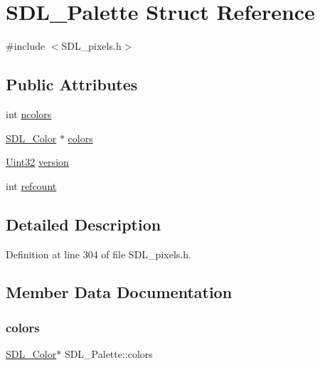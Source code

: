 \hypertarget{struct_s_d_l___palette}{}\section{S\+D\+L\+\_\+\+Palette Struct Reference}
\label{struct_s_d_l___palette}


{\ttfamily \#include $<$S\+D\+L\+\_\+pixels.\+h$>$}

\subsection*{Public Attributes}
\begin{DoxyCompactItemize}
\item 
int \mbox{\hyperlink{struct_s_d_l___palette_a81a0cc3197480e994c6b06f1f0567091}{ncolors}}
\item 
\mbox{\hyperlink{struct_s_d_l___color}{S\+D\+L\+\_\+\+Color}} $\ast$ \mbox{\hyperlink{struct_s_d_l___palette_ad757a50037f43533196e94942440b241}{colors}}
\item 
\mbox{\hyperlink{_s_d_l__stdinc_8h_add440eff171ea5f55cb00c4a9ab8672d}{Uint32}} \mbox{\hyperlink{struct_s_d_l___palette_a5b8d45519f6850a32f13f1602ce37a8e}{version}}
\item 
int \mbox{\hyperlink{struct_s_d_l___palette_a35c667737f883f973bb0a8dea143b08d}{refcount}}
\end{DoxyCompactItemize}


\subsection{Detailed Description}


Definition at line 304 of file S\+D\+L\+\_\+pixels.\+h.



\subsection{Member Data Documentation}
\mbox{\label{struct_s_d_l___palette_ad757a50037f43533196e94942440b241}} 
\subsubsection{\texorpdfstring{colors}{colors}}
{\footnotesize\ttfamily \mbox{\hyperlink{struct_s_d_l___color}{S\+D\+L\+\_\+\+Color}}$\ast$ S\+D\+L\+\_\+\+Palette\+::colors}



